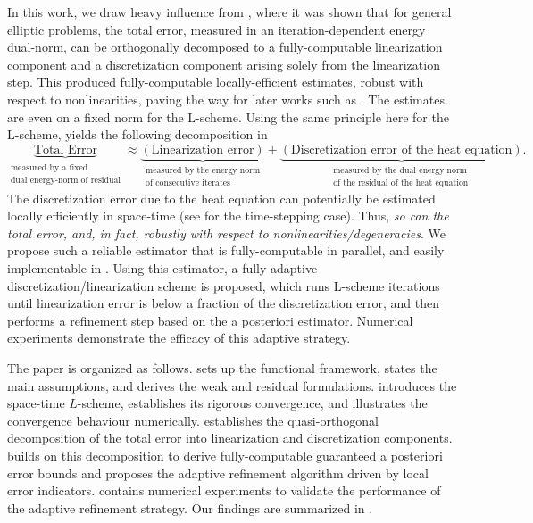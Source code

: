 \documentclass[review,11pt]{article}
\numberwithin{equation}{section}
\begin{document}
In this work, we draw heavy influence from \cite{mitra2023guaranteed}, where it was shown that for general elliptic problems, the total error, measured in an iteration-dependent energy dual-norm, can be orthogonally decomposed to a fully-computable linearization component and a discretization component arising solely from the linearization step. This produced fully-computable locally-efficient estimates, robust with respect to nonlinearities, paving the way for later works such as \cite{harnist2023robust,stokke2023adaptive,javed2025robust}. The estimates are even on a fixed norm for the L-scheme. Using the same principle here for the L-scheme, yields the following decomposition in 
\[
\underbrace{\text{Total Error}}_{\substack{\text{measured by a fixed }\\\text{dual energy-norm of residual}}}\approx \underbrace{\left(\text{Linearization error}\right)}_{\substack{
\text{measured by the energy norm}\\
\text{of consecutive iterates}}} + \underbrace{\left(\text{Discretization error of the heat equation}\right)}_{\substack{
\text{measured by the dual energy norm }\\
\text{of the residual of the heat equation}}}.
\]
The discretization error due to the heat equation can potentially be estimated locally efficiently in space-time (see \cite{ErnSmearsVohralik2017} for the time-stepping case). Thus, \emph{so can the total error, and, in fact, robustly with respect to nonlinearities/degeneracies}. We propose such a reliable estimator that is fully-computable in parallel, and easily implementable in . Using this estimator, a fully adaptive discretization/linearization scheme is proposed, which runs L-scheme iterations until linearization error is below a fraction of the discretization error, and then performs a refinement step based on the a posteriori estimator. Numerical experiments demonstrate the efficacy of this adaptive strategy.

The paper is organized as follows. 
 sets up the functional framework, states the main assumptions, and derives the weak and residual formulations.  introduces the space-time $L$-scheme, establishes its rigorous convergence, and illustrates the convergence behaviour numerically.  establishes the quasi-orthogonal decomposition of the total error into linearization and discretization components.  builds on this decomposition to derive fully-computable guaranteed a posteriori error bounds and proposes the adaptive refinement algorithm driven by local error indicators.  contains numerical experiments to validate the performance of the adaptive refinement strategy. Our findings are summarized in .
\end{document}
